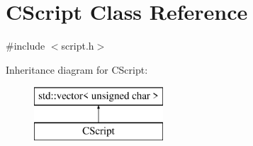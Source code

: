 \hypertarget{class_c_script}{}\section{C\+Script Class Reference}
\label{class_c_script}


{\ttfamily \#include $<$script.\+h$>$}

Inheritance diagram for C\+Script\+:\begin{figure}[H]
\begin{center}
\leavevmode
\includegraphics[height=2.000000cm]{class_c_script}
\end{center}
\end{figure}
